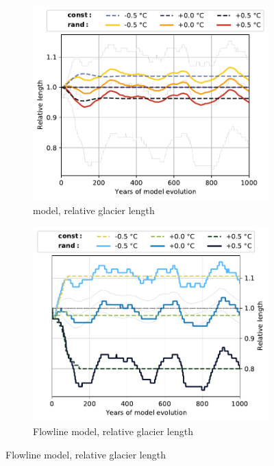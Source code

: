 \begin{figure}[p]
  \begin{subfigure}[b]{0.476\textwidth}
    \caption{\Vas{} model, relative glacier length}
    \label{fig:Mer_de_Glace:length_vas}
    \centering
    \includegraphics[width=\textwidth]{../plots/final_plots/time_series/single_glaciers/length_norm_vas_Mer_de_Glace.pdf}
  \end{subfigure}
  \hfill
  \begin{subfigure}[b]{0.476\textwidth}
    \caption{Flowline model, relative glacier length}
    \label{fig:Mer_de_Glace:length_fl}
    \centering
    \includegraphics[width=\textwidth]{../plots/final_plots/time_series/single_glaciers/length_norm_fl_Mer_de_Glace.pdf}
  \end{subfigure}
  

\end{figure}
